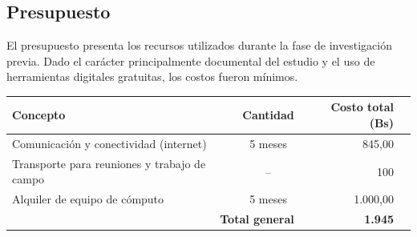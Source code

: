 \subsection{Presupuesto}

El presupuesto presenta los recursos utilizados durante la fase de investigación previa. Dado el carácter principalmente documental del estudio y el uso de herramientas digitales gratuitas, los costos fueron mínimos.

\begin{center}
\begin{tabular}{p{} c r r }
\hline
\textbf{Concepto} & \textbf{Cantidad} & \textbf{Costo total (Bs)} \\
\hline
Comunicación y conectividad (internet) & 5 meses & 845,00 \\
Transporte para reuniones y trabajo de campo &  -- & 100 \\
Alquiler de equipo de cómputo & 5 meses & 1.000,00 \\
\hline
\hline
\multicolumn{2}{r}{\textbf{Total general}} & \textbf{1.945} \\
\hline
\end{tabular}
\captionsetup{hypcap=false}
\label{tab:presupuesto-investigacion-previa}
\end{center}
